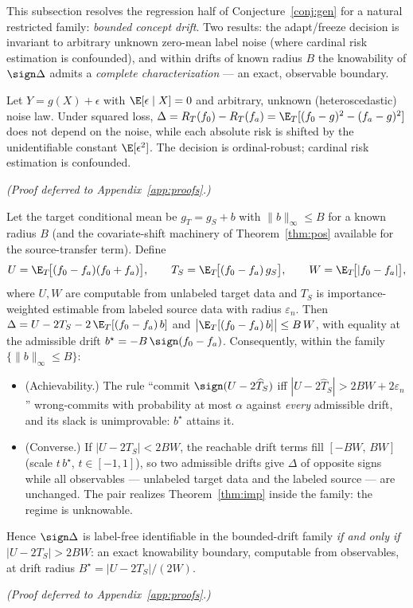 
This subsection resolves the regression half of Conjecture~\ref{conj:gen} for a natural
restricted family: \emph{bounded concept drift}. Two results: the adapt/freeze decision
is invariant to arbitrary unknown zero-mean label noise (where cardinal risk estimation
is confounded), and within drifts of known radius $B$ the knowability of $\sign\Delta$
admits a \emph{complete characterization} --- an exact, observable boundary.

\begin{theorem}\label{thm:reg-noise}
Let $Y=g(X)+\epsilon$ with $\E[\epsilon\mid X]=0$ and arbitrary, unknown
(heteroscedastic) noise law. Under squared loss,
$\Delta=R_T(f_0)-R_T(f_a)=\E_T[(f_0-g)^2-(f_a-g)^2]$ does not depend on the noise,
while each absolute risk is shifted by the unidentifiable constant $\E[\epsilon^2]$.
The decision is ordinal-robust; cardinal risk estimation is confounded.
\end{theorem}
\emph{(Proof deferred to Appendix~\ref{app:proofs}.)}

\begin{theorem}\label{thm:reg-iff}
Let the target conditional mean be $g_T=g_S+b$ with $\|b\|_\infty\le B$ for a known
radius $B$ (and the covariate-shift machinery of Theorem~\ref{thm:pos} available for the
source-transfer term). Define
\[
U=\E_T\!\big[(f_0-f_a)(f_0+f_a)\big],\qquad
T_S=\E_T\!\big[(f_0-f_a)\,g_S\big],\qquad
W=\E_T\!\big[|f_0-f_a|\big],
\]
where $U,W$ are computable from unlabeled target data and $T_S$ is importance-weighted
estimable from labeled source data with radius $\varepsilon_n$. Then
$\Delta=U-2T_S-2\,\E_T[(f_0-f_a)\,b]$ and $\big|\E_T[(f_0-f_a)\,b]\big|\le B\,W$, with
equality at the admissible drift $b^\star=-B\,\sign(f_0-f_a)$. Consequently, within the
family $\{\|b\|_\infty\le B\}$:
\begin{itemize}
\item[\textup{(i)}] \textup{(Achievability.)} The rule ``commit $\sign(U-2\widehat T_S)$
iff $|U-2\widehat T_S|>2BW+2\varepsilon_n$'' wrong-commits with probability at most
$\alpha$ against \emph{every} admissible drift, and its slack is unimprovable:
$b^\star$ attains it.
\item[\textup{(ii)}] \textup{(Converse.)} If $|U-2T_S|<2BW$, the reachable drift terms
fill $[-BW,\,BW]$ (scale $t\,b^\star$, $t\in[-1,1]$), so two admissible drifts give
$\Delta$ of opposite signs while all observables --- unlabeled target data and the
labeled source --- are unchanged. The pair realizes Theorem~\ref{thm:imp} inside the
family: the regime is unknowable.
\end{itemize}
Hence $\sign\Delta$ is label-free identifiable in the bounded-drift family \emph{if and
only if} $|U-2T_S|>2BW$: an exact knowability boundary, computable from observables, at
drift radius $B^\star=|U-2T_S|/(2W)$.
\end{theorem}
\emph{(Proof deferred to Appendix~\ref{app:proofs}.)}

